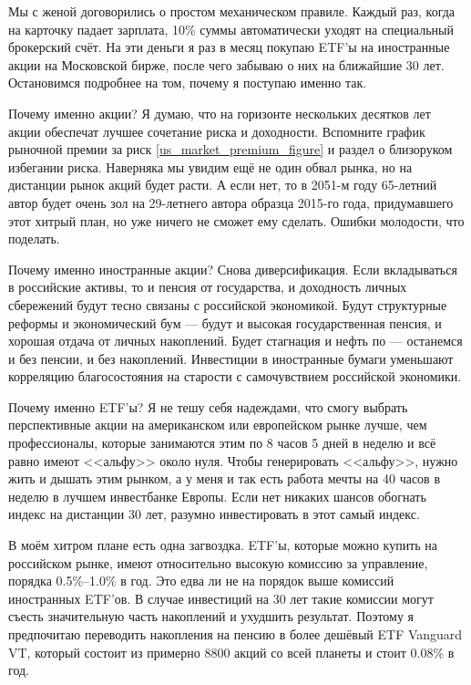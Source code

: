 Мы с женой договорились о простом механическом правиле. Каждый раз, когда на 
карточку падает зарплата, 10\% суммы автоматически уходят на специальный 
брокерский счёт. На эти деньги я раз в месяц покупаю ETF'ы на иностранные акции 
на Московской бирже, после чего забываю о них на ближайшие 30 лет. Остановимся 
подробнее на том, почему я поступаю именно так.
 
Почему именно акции? Я думаю, что на горизонте нескольких десятков лет акции 
обеспечат лучшее сочетание риска и доходности. Вспомните график рыночной премии 
за риск \ref{us_market_premium_figure} и раздел о близоруком избегании риска. 
Наверняка мы увидим ещё не один обвал рынка, но на дистанции рынок акций будет 
расти. А если нет, то в 2051\nobreakdash-м году 65\nobreakdash-летний автор 
будет очень зол на 29\nobreakdash-летнего автора образца 2015\nobreakdash-го 
года, придумавшего этот хитрый план, но уже ничего не сможет ему сделать. 
Ошибки молодости, что поделать.

Почему именно иностранные акции? Снова диверсификация. Если вкладываться в 
российские активы, то и пенсия от государства, и доходность личных сбережений 
будут тесно связаны с российской экономикой. Будут структурные реформы и 
экономический бум --- будут и высокая государственная пенсия, и хорошая отдача 
от личных накоплений. Будет стагнация и нефть по  --- останемся и 
без пенсии, и без накоплений. Инвестиции в иностранные бумаги уменьшают 
корреляцию благосостояния на старости с самочувствием российской экономики.

Почему именно ETF'ы? Я не тешу себя надеждами, что смогу выбрать перспективные 
акции на американском или европейском рынке лучше, чем профессионалы, которые 
занимаются этим по 8 часов 5 дней в неделю и всё равно имеют <<альфу>> около 
нуля. Чтобы генерировать <<альфу>>, нужно жить и дышать этим рынком, а у меня и 
так есть работа мечты на 40 часов в неделю в лучшем инвестбанке Европы. Если 
нет никаких шансов обогнать индекс на дистанции 30 лет, разумно инвестировать в 
этот самый индекс.

В моём хитром плане есть одна загвоздка. ETF'ы, которые можно купить на 
российском рынке, имеют относительно высокую комиссию за управление, порядка 
0.5\%--1.0\% в год. Это едва ли не на порядок выше комиссий иностранных ETF'ов. 
В случае инвестиций на 30 лет такие комиссии могут съесть значительную часть 
накоплений и ухудшить результат. Поэтому я предпочитаю переводить накопления на 
пенсию в более дешёвый ETF Vanguard VT, который состоит из примерно 8800 акций 
со всей планеты и стоит 0.08\% в год.

